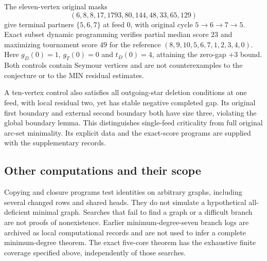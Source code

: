 The eleven-vertex original masks
\[
 (6,8,8,17,1793,80,144,48,33,65,129)
\]
give terminal partners $\{5,6,7\}$ at feed $0$, with original cycle
$5\to6\to7\to5$. Exact subset dynamic programming verifies partial
median score $23$ and maximizing tournament score $49$ for the reference
$(8,9,10,5,6,7,1,2,3,4,0)$. Here
$g_D(0)=1$, $g_T(0)=0$ and $t_D(0)=4$, attaining the zero-gap $+3$ bound.
Both controls contain Seymour vertices and are not counterexamples to
the conjecture or to the MIN residual estimates.

A ten-vertex control also satisfies all outgoing-star deletion conditions
at one feed, with local residual two, yet has stable negative completed
gap. Its original first boundary and external second boundary both have
size three, violating the global boundary lemma. This distinguishes
single-feed criticality from full original arc-set minimality. Its explicit
data and the exact-score programs are supplied with the supplementary records.

\subsection{Other computations and their scope}
Copying and closure programs test identities on arbitrary graphs, including
several changed rows and shared heads. They do not simulate a hypothetical
all-deficient minimal graph. Searches that fail to find a graph or a difficult
branch are not proofs of nonexistence. Earlier minimum-degree-seven branch
logs are archived as local computational records and are not used to infer
a complete minimum-degree theorem. The exact five-core theorem has the
exhaustive finite coverage specified above, independently of those searches.
